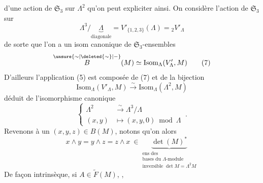 d'une action de $\mathfrak{S}_3$ sur  $\Lambda^2$ qu'on peut expliciter ainsi. On considère l'action de $\mathfrak{S}_3$ sur
\[
\Lambda^3/\underbrace{\Lambda}_{\text{diagonale}}=V'_{\{1,2,3\}}(\Lambda)={}_{2}V'_{\Lambda}\tag*{(6)}
\]
de sorte que l'on a un isom canonique de $\mathfrak{S}_3$-ensembles
\[
\overset{\unsure{\sim|\deleted{\sim}|-}}{B}(M)\simeq\mathrm{Isom}_{\Lambda}(V'_{\Lambda},M)\tag*{(7)}
\]
D'ailleurs  l'application (5) est composée de (7) et de la bijection
\[
\mathrm{Isom}_{\Lambda}(V'_{\Lambda},M)\xrightarrow{\sim}\mathrm{Isom}_{\Lambda}(\Lambda^2,M)
\]
déduit de l'isomorphisme canonique
\[
\left\{\begin{aligned}
\Lambda^2&\xrightarrow{\sim}\Lambda^3/\Lambda\\
(x,y)&\longmapsto(x,y,0)\bmod\Lambda
\end{aligned}\right. \ .\tag*{(8)}
\]
Revenons à un $(x,y,z)\in B(M)$, notons qu'on  alors
\[
x\wedge y=y\wedge z=z\wedge x\ \in
\underbrace{\det(M)^*}_{\substack{\text{ens des}\\\text{bases du }\Lambda\text{-module}\\\text{inversible }\det M=\Lambda^2 M}}\tag*{(9)}
\]
De façon intrinsèque, si $A\in\widetilde F(M)$,  ,
